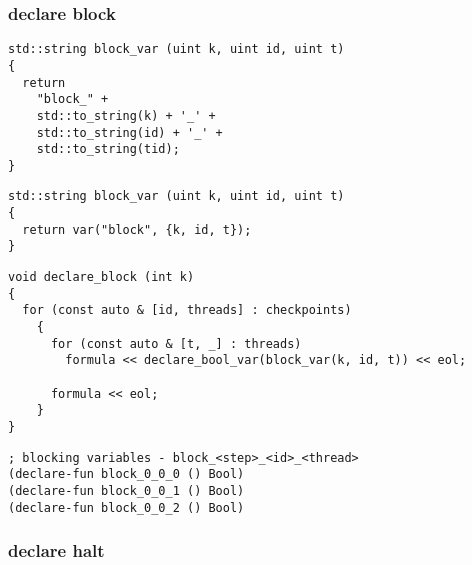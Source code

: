 \subsubsection{declare block}

\begin{algorithm}[H]
\end{algorithm}

\begin{algorithm}[H]
\end{algorithm}

\begin{lstlisting}[style=c++]
std::string block_var (uint k, uint id, uint t)
{
  return
    "block_" +
    std::to_string(k) + '_' +
    std::to_string(id) + '_' +
    std::to_string(tid);
}
\end{lstlisting}

\begin{lstlisting}[style=c++]
std::string block_var (uint k, uint id, uint t)
{
  return var("block", {k, id, t});
}
\end{lstlisting}

\begin{lstlisting}[style=c++]
void declare_block (int k)
{
  for (const auto & [id, threads] : checkpoints)
    {
      for (const auto & [t, _] : threads)
        formula << declare_bool_var(block_var(k, id, t)) << eol;

      formula << eol;
    }
}
\end{lstlisting}

\begin{lstlisting}[language=SMTLib]
; blocking variables - block_<step>_<id>_<thread>
(declare-fun block_0_0_0 () Bool)
(declare-fun block_0_0_1 () Bool)
(declare-fun block_0_0_2 () Bool)
\end{lstlisting}

\subsubsection{declare halt}

